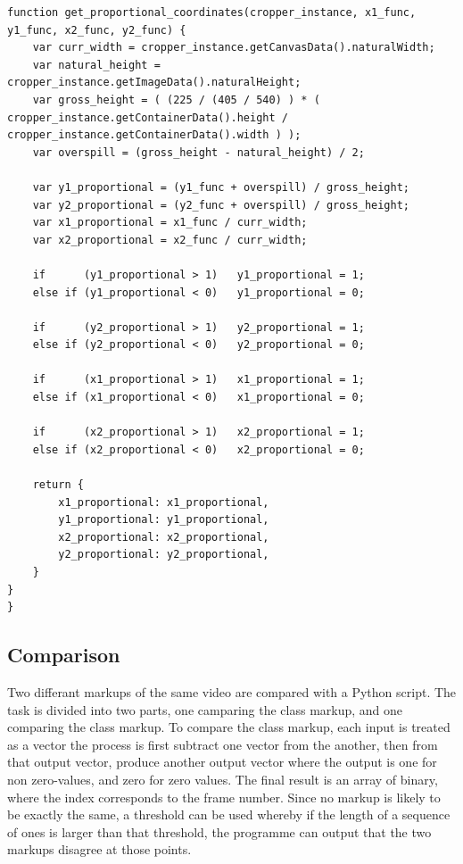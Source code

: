             \begin{lstlisting}[style=JSStyle]
function get_proportional_coordinates(cropper_instance, x1_func, y1_func, x2_func, y2_func) {
    var curr_width = cropper_instance.getCanvasData().naturalWidth;
    var natural_height = cropper_instance.getImageData().naturalHeight;
    var gross_height = ( (225 / (405 / 540) ) * ( cropper_instance.getContainerData().height / cropper_instance.getContainerData().width ) );
    var overspill = (gross_height - natural_height) / 2;

    var y1_proportional = (y1_func + overspill) / gross_height;
    var y2_proportional = (y2_func + overspill) / gross_height;
    var x1_proportional = x1_func / curr_width;
    var x2_proportional = x2_func / curr_width;

    if      (y1_proportional > 1)   y1_proportional = 1;
    else if (y1_proportional < 0)   y1_proportional = 0;

    if      (y2_proportional > 1)   y2_proportional = 1;
    else if (y2_proportional < 0)   y2_proportional = 0;

    if      (x1_proportional > 1)   x1_proportional = 1;
    else if (x1_proportional < 0)   x1_proportional = 0;

    if      (x2_proportional > 1)   x2_proportional = 1;
    else if (x2_proportional < 0)   x2_proportional = 0;

    return {
        x1_proportional: x1_proportional,
        y1_proportional: y1_proportional,
        x2_proportional: x2_proportional,
        y2_proportional: y2_proportional,
    }
}
}\end{lstlisting} 

    \subsection{Comparison}
    Two differant markups of the same video are compared with a Python script. The task is divided into two parts, one camparing the class markup, and one comparing the class markup.  To compare the class markup, each input is treated as a vector the process is first subtract one vector from the another, then from that output vector, produce another output vector where the output is one for non zero-values, and zero for zero values. The final result is an array of binary, where the index corresponds to the frame number. Since no markup is likely to be exactly the same, a threshold can be used whereby if the length of a sequence of ones is larger than that threshold, the programme can output that the two markups disagree at those points.
    

